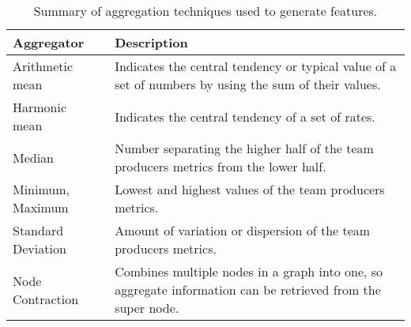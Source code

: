 \begin{table}[t]
\caption{\label{tab:agg} Summary of aggregation techniques used to generate features.}
\centering
\begin{tabular}{@{}p{3.6cm}@{} p{8cm}@{}}
\toprule
\textbf{Aggregator} & \textbf{Description}\\
\midrule
\parbox[t]{2.0cm}{Arithmetic\\mean} & Indicates the central tendency or typical value of a set of numbers by using the sum of their values.\\
\midrule
\parbox[t]{2.0cm}{Harmonic\\mean} &  Indicates the central tendency of a set of rates.\\
\midrule
Median & Number separating the higher half of  the team producers metrics from the lower half.  \\
\midrule
\parbox[t]{2.0cm}{Minimum, Maximum} &  Lowest and highest values of the team producers metrics.\\
\midrule
\parbox[t]{2.0cm}{Standard\\Deviation} & Amount of variation or dispersion of the team producers metrics.\\
\midrule
\parbox[t]{2.0cm}{Node\\Contraction} & Combines multiple nodes in a graph into one, so aggregate information can be retrieved from the super node.\\
\bottomrule
\end{tabular}
\end{table}
